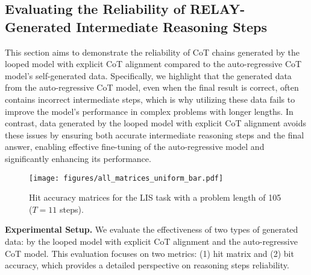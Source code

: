 \subsection{Evaluating the Reliability of RELAY-Generated Intermediate Reasoning Steps}\label{ssec:relay_step_reliability}
This section aims to demonstrate the reliability of CoT chains generated by the looped model with explicit CoT alignment compared to the auto-regressive CoT model's self-generated data. Specifically, we highlight that the generated data from the auto-regressive CoT model, even when the final result is correct, often contains incorrect intermediate steps, which is why utilizing these data fails to improve the model's performance in complex problems with longer lengths. In contrast, data generated by the looped model with explicit CoT alignment avoids these issues by ensuring both accurate intermediate reasoning steps and the final answer, enabling effective fine-tuning of the auto-regressive model and significantly enhancing its performance.

\begin{figure}
    \centering
    \texttt{[image: figures/all\_matrices\_uniform\_bar.pdf]}
    \vspace{-20pt}
    \caption{Hit accuracy matrices for the LIS task with a problem length of 105 ($T = 11$ steps).} 
    \label{fig:matrix}
    \vspace{-5pt}
\end{figure}



\textbf{Experimental Setup. }
We evaluate the effectiveness of two types of generated data: by the looped model with explicit CoT alignment and the auto-regressive CoT model. This evaluation focuses on two metrics: (1) hit matrix and (2) bit accuracy, which provides a detailed perspective on reasoning steps reliability.


